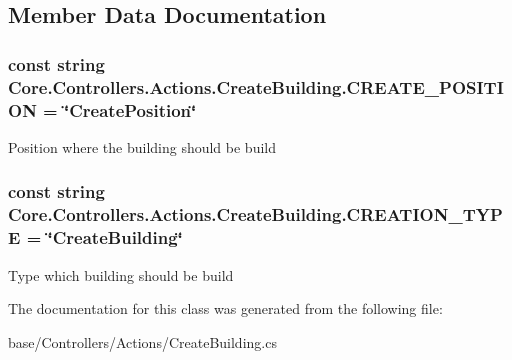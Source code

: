 \subsection{Member Data Documentation}
\hypertarget{classCore_1_1Controllers_1_1Actions_1_1CreateBuilding_a645f44c080fd7a2ac4f12dbc4f6a7236}{}
\subsubsection[{C\+R\+E\+A\+T\+E\+\_\+\+P\+O\+S\+I\+T\+I\+O\+N}]{\setlength{\rightskip}{0pt plus 5cm}const string Core.\+Controllers.\+Actions.\+Create\+Building.\+C\+R\+E\+A\+T\+E\+\_\+\+P\+O\+S\+I\+T\+I\+O\+N = \char`\"{}Create\+Position\char`\"{}}\label{classCore_1_1Controllers_1_1Actions_1_1CreateBuilding_a645f44c080fd7a2ac4f12dbc4f6a7236}


Position where the building should be build 

\hypertarget{classCore_1_1Controllers_1_1Actions_1_1CreateBuilding_a49558a15ada07def227affd712b6498a}{}
\subsubsection[{C\+R\+E\+A\+T\+I\+O\+N\+\_\+\+T\+Y\+P\+E}]{\setlength{\rightskip}{0pt plus 5cm}const string Core.\+Controllers.\+Actions.\+Create\+Building.\+C\+R\+E\+A\+T\+I\+O\+N\+\_\+\+T\+Y\+P\+E = \char`\"{}Create\+Building\char`\"{}}\label{classCore_1_1Controllers_1_1Actions_1_1CreateBuilding_a49558a15ada07def227affd712b6498a}


Type which building should be build 



The documentation for this class was generated from the following file\+:\begin{DoxyCompactItemize}
\item 
base/\+Controllers/\+Actions/Create\+Building.\+cs\end{DoxyCompactItemize}
